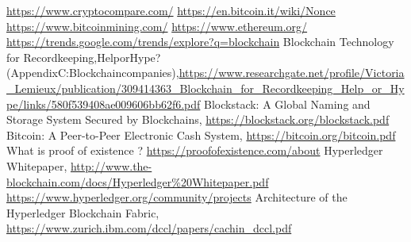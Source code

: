 \documentclass[a4paper]{article}
\begin{document}
\begin{thebibliography}{9}
\url{https://www.cryptocompare.com/}
\url{https://en.bitcoin.it/wiki/Nonce}
\url{https://www.bitcoinmining.com/}
\url{https://www.ethereum.org/}
\url{https://trends.google.com/trends/explore?q=blockchain}
 Blockchain Technology for Recordkeeping,\enspace Help\enspace or\enspace Hype\enspace ?\enspace (Appendix\enspace C:\enspace Blockchain\enspace companies),\newline \url{https://www.researchgate.net/profile/Victoria_Lemieux/publication/309414363_Blockchain_for_Recordkeeping_Help_or_Hype/links/580f539408ae009606bb62f6.pdf}
Blockstack: A Global Naming and Storage System Secured by Blockchains, \url{https://blockstack.org/blockstack.pdf}
Bitcoin: A Peer-to-Peer Electronic Cash System, \url{https://bitcoin.org/bitcoin.pdf} 
What is proof of existence ? \url{https://proofofexistence.com/about}
Hyperledger Whitepaper, \url{http://www.the-blockchain.com/docs/Hyperledger\%20Whitepaper.pdf} 
\url{https://www.hyperledger.org/community/projects}
Architecture of the Hyperledger Blockchain Fabric, \url{https://www.zurich.ibm.com/dccl/papers/cachin_dccl.pdf}
\end{thebibliography}
\end{document}
